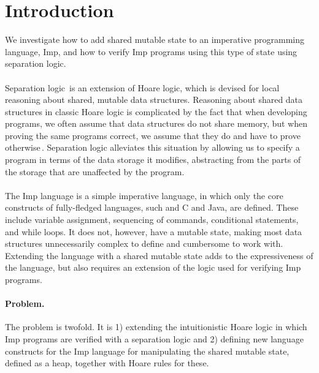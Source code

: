 \section{Introduction}
We investigate how to add shared mutable state to an imperative programming language, Imp, and how to verify Imp programs using this type of state using separation logic.
\paragraph{}
Separation logic\,\cite{Reynolds02} is an extension of Hoare logic, which is devised for local reasoning about shared, mutable data structures. Reasoning about shared data structures in classic Hoare logic is complicated by the fact that when developing programs, we often assume that data structures do not share memory, but when proving the same programs correct, we assume that they do and have to prove otherwise\,\cite{reynolds2008AnIntroductionTo}. Separation logic alleviates this situation by allowing us to specify a program in terms of the data storage it modifies, abstracting from the parts of the storage that are unaffected by the program.
\paragraph{}
The Imp language is a simple imperative language, in which only the core constructs of fully-fledged languages, such and C and Java, are defined. These include variable assignment, sequencing of commands, conditional statements, and while loops. It does not, however, have a mutable state, making most data structures unnecessarily complex to define and cumbersome to work with. Extending the language with a shared mutable state adds to the expressiveness of the language, but also requires an extension of the logic used for verifying Imp programs.

\paragraph{Problem.}
The problem is twofold. It is 1) extending the intuitionistic Hoare logic in which Imp programs are verified with a separation logic and 2) defining new language constructs for the Imp language for manipulating the shared mutable state, defined as a heap, together with Hoare rules for these.


